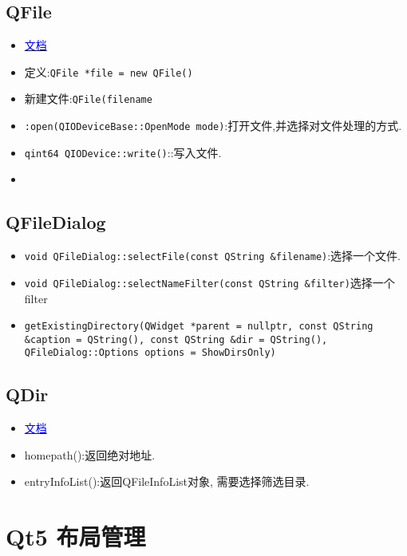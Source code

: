 \documentclass[11pt]{article}
\begin{document}
\subsection{QFile}
\begin{itemize}
\item \href{https://doc.qt.io/qt-6/qudpsocket.html#details}{
\textcolor{blue}{文档}}
\item 定义:\verb|QFile *file = new QFile()|
\item 新建文件:\verb|QFile(filename|
\item \verb|:open(QIODeviceBase::OpenMode mode)|:打开文件,并选择对文件处理的方式.
\item \verb|qint64 QIODevice::write()|::写入文件.
\item \verb||
\end{itemize}

\subsection{QFileDialog}
\begin{itemize}
\item \verb|void QFileDialog::selectFile(const QString &filename)|:选择一个文件.
\item \verb|void QFileDialog::selectNameFilter(const QString &filter)|选择一个filter
\item \verb|getExistingDirectory(QWidget *parent = nullptr, const QString &caption = QString(), const QString &dir = QString(), QFileDialog::Options options = ShowDirsOnly)|
\end{itemize}

\subsection{QDir}
\begin{itemize}
\item \href{https://doc.qt.io/qt-6/qdir.html#homePath}{
\textcolor{blue}{文档}}
\item homepath():返回绝对地址.
\item entryInfoList():返回QFileInfoList对象, 需要选择筛选目录.
\end{itemize}

\newpage



\section{Qt5 布局管理}
\end{document}
